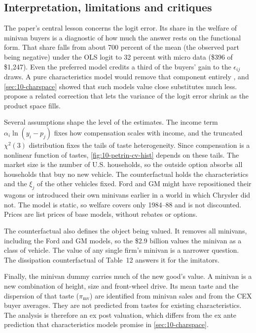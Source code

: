 \subsection{Interpretation, limitations and critiques}\label{sec:10-petrin-critique}

The paper's central lesson concerns the logit error. Its share in the welfare of minivan buyers is a diagnostic of how
much the answer rests on the functional form. That share falls from about 700 percent of the mean (the observed part
being negative) under the OLS logit to 32 percent with micro data (\$396 of \$1,247). Even the preferred model credits a
third of the buyers' gain to the $\epsilon_{ij}$ draws. A pure characteristics model would remove that component
entirely \citep{BerryPakes2007}, and \cref{sec:10-charspace} showed that such models value close substitutes much less.
\citet{AckerbergRysman2005} propose a related correction that lets the variance of the logit error shrink as the
product space fills.

Several assumptions shape the level of the estimates. The income term $\alpha_i\ln(y_i - p_j)$ fixes how compensation
scales with income, and the truncated $\chi^2(3)$ distribution fixes the tails of taste heterogeneity. Since compensation
is a nonlinear function of tastes, \cref{fig:10-petrin-cv-hist} depends on these tails. The market size is the number of
U.S. households, so the outside option absorbs all households that buy no new vehicle. The counterfactual holds the
characteristics and the $\xi_j$ of the other vehicles fixed. Ford and GM might have repositioned their wagons or
introduced their own minivans earlier in a world in which Chrysler did not. The model is static, so welfare covers
only 1984--88 and is not discounted. Prices are list prices of base models, without rebates or options.

The counterfactual also defines the object being valued. It removes all minivans, including the Ford and GM models,
so the \$2.9 billion values the minivan as a class of vehicle. The value of any single firm's minivan is a narrower
question. The dissipation counterfactual of Table~12 answers it for the imitators.

Finally, the minivan dummy carries much of the new good's value. A minivan is a new combination of height, size and
front-wheel drive. Its mean taste and the dispersion of that taste ($\pi_{\mathrm{mv}}$) are identified from minivan
sales and from the CEX buyer averages. They are not predicted from tastes for existing characteristics. The
analysis is therefore an ex post valuation, which differs from the ex ante prediction that characteristics models
promise in \cref{sec:10-charspace}.


